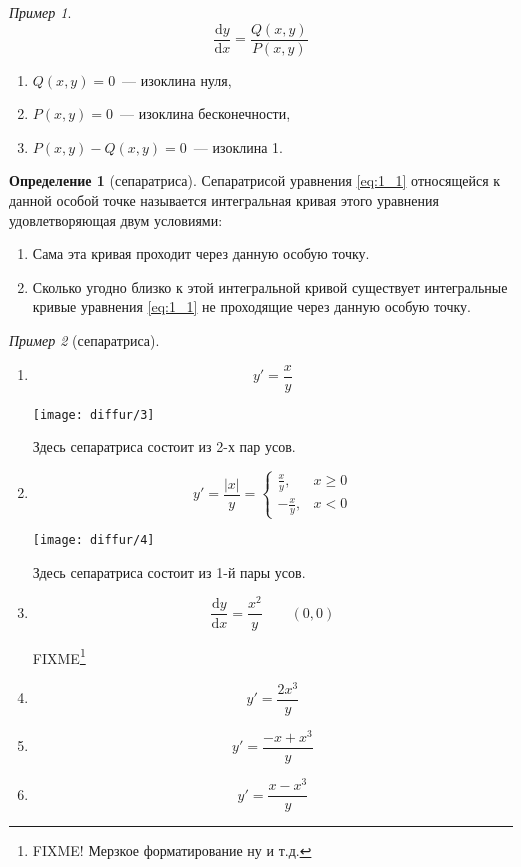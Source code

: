 \documentclass[a4paper,10pt]{report}
\newcommand{\ud}{\mathrm{d}}
\theoremstyle{definition}
\newtheorem{definition}{Определение}[section]
\theoremstyle{remark}
\newtheorem{example}{Пример}[section]
\theoremstyle{plain}
\begin{document}
\begin{example}
 \[
  \frac{\ud y}{\ud x} = \frac{Q(x,y)}{P(x,y)}
 \]
 \begin{enumerate}
 \item $Q(x,y) = 0$~--- изоклина нуля,
 \item $P(x,y) = 0$~--- изоклина бесконечности,
 \item $P(x,y)-Q(x,y) = 0$~--- изоклина 1.
\end{enumerate}
\end{example}

\begin{definition}[сепаратриса]
 Сепаратрисой уравнения \eqref{eq:1_1} относящейся к данной особой точке называется интегральная кривая этого уравнения удовлетворяющая двум условиями:
 \begin{enumerate}
 \item Сама эта кривая проходит через данную особую точку.
 \item Сколько угодно близко к этой интегральной кривой существует интегральные кривые уравнения \eqref{eq:1_1} не проходящие через данную особую точку.
\end{enumerate}
\end{definition}

\begin{example}[сепаратриса]
 \mbox{}
 \begin{enumerate}
  \item
  \[
   y' = \frac{x}{y}
  \]
  \begin{center}
   \texttt{[image: diffur/3]}
  \end{center}
  Здесь сепаратриса состоит из 2-х пар усов.

  \item
  \[
   y' = \frac{|x|}{y} = \begin{cases}
    \frac{x}{y}, & x \ge 0 \\
    -\frac{x}{y}, & x < 0
   \end{cases}
  \]
  \begin{center}
   \texttt{[image: diffur/4]}
  \end{center}
  Здесь сепаратриса состоит из 1-й пары усов.

  \item
  \[
   \frac{\ud y}{\ud x} = \frac{x^2}{y} \qquad (0,0)
  \]

  FIXME\footnote{FIXME! Мерзкое форматирование ну и т.д.}

  \item
  \[
   y' = \frac{2x^3}{y}
  \]

  \item
  \[
   y' = \frac{-x+x^3}{y}
  \]

  \item
  \[
   y' = \frac{x-x^3}{y}
  \]
 \end{enumerate}
\end{example}
\end{document}
